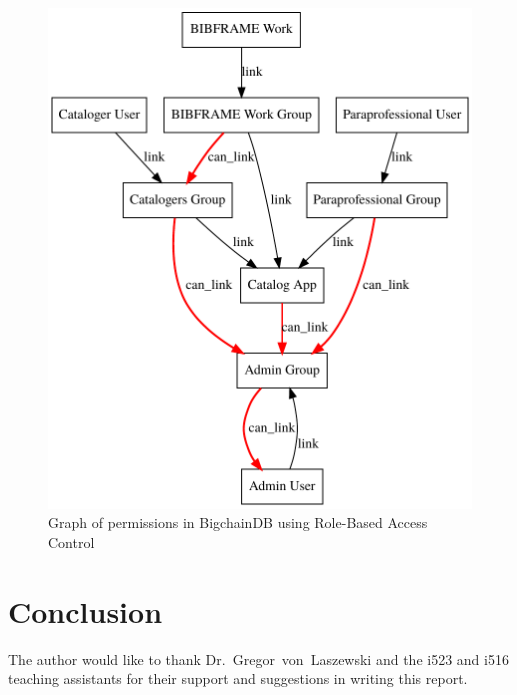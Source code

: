 \begin{figure}[!htb]
	\centering\includegraphics[width=\columnwidth]{images/rbac-graph.pdf}  
	\caption{Graph of permissions in BigchainDB using Role-Based Access 
	Control}\label{f:rbac2}
\end{figure}




\section{Conclusion}


\begin{acks}
The author would like to thank Dr.~Gregor~von~Laszewski and the i523
and i516 teaching assistants for their support and suggestions in writing
this report.
\end{acks}


 

